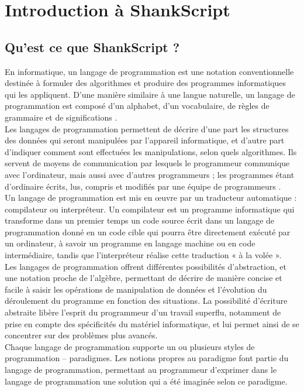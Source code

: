 \chapter{Introduction à ShankScript}


\section{Qu'est ce que ShankScript ?}


En informatique, un langage de programmation est une notation conventionnelle destinée à formuler des algorithmes et produire des programmes informatiques qui les appliquent. D'une manière similaire à une langue naturelle, un langage de programmation est composé d'un alphabet, d'un vocabulaire, de règles de grammaire et de significations .
\\[0.5cm]
Les langages de programmation permettent de décrire d'une part les structures des données qui seront manipulées par l'appareil informatique, et d'autre part d'indiquer comment sont effectuées les manipulations, selon quels algorithmes. Ils servent de moyens de communication par lesquels le programmeur communique avec l'ordinateur, mais aussi avec d'autres programmeurs ; les programmes étant d'ordinaire écrits, lus, compris et modifiés par une équipe de programmeurs .
\\[0.5cm]
Un langage de programmation est mis en œuvre par un traducteur automatique : compilateur ou interpréteur. Un compilateur est un programme informatique qui transforme dans un premier temps un code source écrit dans un langage de programmation donné en un code cible qui pourra être directement exécuté par un ordinateur, à savoir un programme en langage machine ou en code intermédiaire, tandis que l'interpréteur réalise cette traduction « à la volée ».
\\[0.5cm]
Les langages de programmation offrent différentes possibilités d'abstraction, et une notation proche de l'algèbre, permettant de décrire de manière concise et facile à saisir les opérations de manipulation de données et l'évolution du déroulement du programme en fonction des situations. La possibilité d'écriture abstraite libère l'esprit du programmeur d'un travail superflu, notamment de prise en compte des spécificités du matériel informatique, et lui permet ainsi de se concentrer sur des problèmes plus avancés.
\\[0.5cm]
Chaque langage de programmation supporte un ou plusieurs styles de programmation – paradigmes. Les notions propres au paradigme font partie du langage de programmation, permettant au programmeur d'exprimer dans le langage de programmation une solution qui a été imaginée selon ce paradigme.
